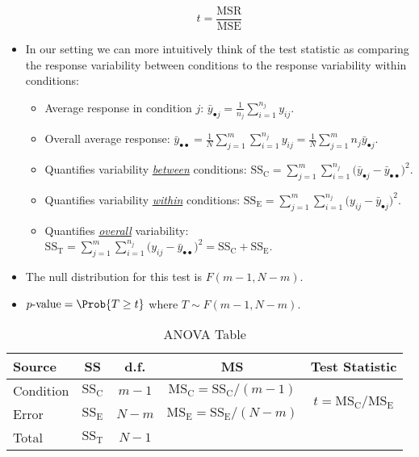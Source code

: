 \begin{itemize}
            \[ t=\frac{\text{MSR}}{\text{MSE}} \]
      \item In our setting we can more intuitively think of the test
            statistic as comparing the response variability
            between conditions to the response variability within conditions:
            \begin{itemize}
                  \item Average response in condition $ j $: $ \displaystyle \bar{y}_{\bullet j}=\frac{1}{n_j} \sum_{i=1}^{n_j} y_{ij} $.
                  \item Overall average response: $ \displaystyle \bar{y}_{\bullet\bullet}=\frac{1}{N} \sum_{j=1}^{m} \sum_{i=1}^{n_j} y_{ij}=\frac{1}{N} \sum_{j=1}^{m} n_j\bar{y}_{\bullet j} $.
                  \item Quantifies variability \underline{\emph{between}} conditions:
                        $ \displaystyle \text{SS}_\text{C}=\sum_{j=1}^{m} \sum_{i=1}^{n_j} \bigl(\bar{y}_{\bullet j}-\bar{y}_{\bullet\bullet}\bigr)^2 $.
                  \item Quantifies variability \underline{\emph{within}} conditions:
                        $ \displaystyle \text{SS}_\text{E}=\sum_{j=1}^{m} \sum_{i=1}^{n_j} \bigl(y_{ij}-\bar{y}_{\bullet j}\bigr)^2 $.
                  \item Quantifies \underline{\emph{overall}} variability:
                        $ \displaystyle \text{SS}_\text{T}=\sum_{j=1}^{m} \sum_{i=1}^{n_j} \bigl(y_{ij}-\bar{y}_{\bullet\bullet}\bigr)^2=\text{SS}_\text{C}+\text{SS}_\text{E} $.
            \end{itemize}
      \item The null distribution for this test is $ F(m-1,N-m) $.
      \item $ p\text{-value}=\Prob{T\ge t} $ where $ T \sim F(m-1,N-m) $.
\end{itemize}
\begin{table}[!htbp]
      \centering
      \caption{ANOVA Table}
      \begin{NiceTabular}{|l|c|c|c|c|}
            \toprule
            Source    & SS                     & d.f.    & MS                                                               & Test Statistic                                                   \\
            \midrule
            Condition & $ \text{SS}_\text{C} $ & $ m-1 $ & $ \text{MS}_\text{C}=\text{SS}_\text{C}/(m-1) $ &  \\
            Error     & $ \text{SS}_\text{E} $ & $ N-m $ & $ \text{MS}_\text{E}=\text{SS}_\text{E}/(N-m) $                                                               \\
            \midrule
            Total     & $ \text{SS}_\text{T} $ & $ N-1 $\\
            \bottomrule
      \end{NiceTabular}
\end{table}
\pagebreak
